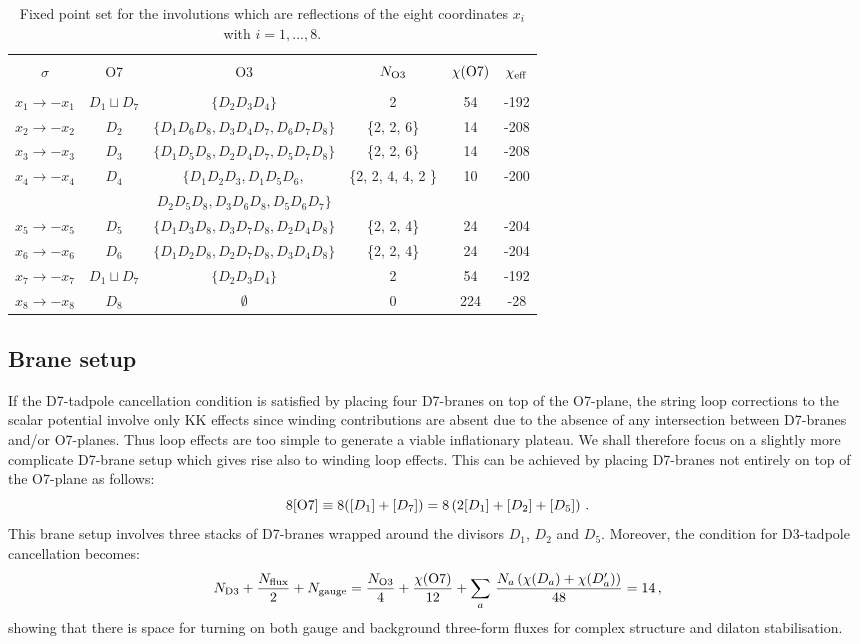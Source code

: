 \documentclass[11pt,a4paper]{article}
\newcommand{\be}{\begin{equation}}
\newcommand{\ee}{\end{equation}}
\def\nn{\nonumber}
\begin{document}
\begin{table}[H]
 \hskip-0cm
\begin{tabular}{|c|c|c|c|c|c|}
\hline
&  &  &  &  &  \\
$\sigma$ & O7  & O3  & $N_{\rm O3}$  & $\chi({\rm O7})$  & $\chi_{\rm eff}$       \\
&  &  &  &  &  \\
\hline
\hline
$x_1 \to -x_1$ &  $D_1\sqcup D_7$ & $\{D_2 D_3 D_4 \}$ & 2 & 54 & -192  \\
$x_2 \to -x_2$ &  $D_2$ & $\{{D_1 D_6 D_8}, {D_3 D_4 D_7}, {D_6 D_7 D_8}\}$ & \{2, 2, 6\} & 14 & -208 \\
$x_3 \to -x_3$ &  $D_3$ & $\{{D_1 D_5 D_8}, {D_2 D_4 D_7}, {D_5 D_7 D_8}\}$ & \{2, 2, 6\} & 14 & -208 \\
$x_4 \to -x_4$ &  $D_4$ & $\{{D_1 D_2 D_3}, {D_1 D_5 D_6}, $ & \{2, 2, 4, 4, 2 \} & 10 & -200  \\
 & & ${D_2 D_5 D_8}, {D_3 D_6 D_8}, {D_5 D_6 D_7} \}$ & & & \\
$x_5 \to -x_5$ &  $D_5$ & $\{{D_1 D_3 D_8}, {D_3  D_7 D_8}, {D_2 D_4 D_8} \}$ & \{2, 2, 4\} & 24 & -204  \\
$x_6 \to -x_6$ &  $D_6$ & $\{{D_1 D_2 D_8}, {D_2  D_7 D_8}, {D_3 D_4 D_8} \}$ & \{2, 2, 4\} & 24 & -204  \\
$x_7 \to -x_7$ &  $D_1\sqcup D_7$ & $\{D_2 D_3 D_4 \}$ & 2 & 54 & -192  \\
$x_8 \to -x_8$ &  $D_8$ & $\emptyset$ & 0 & 224 & -28  \\
\hline
\end{tabular}
\caption{Fixed point set for the involutions which are reflections of the eight coordinates $x_i$ with $i=1,...,8$.} 
\label{FixedPointsB} 
\end{table}

\subsection{Brane setup}

If the D7-tadpole cancellation condition is satisfied by placing four D7-branes on top of the O7-plane, the string loop corrections to the scalar potential involve only KK effects since winding contributions are absent due to the absence of any intersection between D7-branes and/or O7-planes. Thus loop effects are too simple to generate a viable inflationary plateau. We shall therefore focus on a slightly more complicate D7-brane setup which gives rise also to winding loop effects. This can be achieved by placing D7-branes not entirely on top of the O7-plane as follows:  
\be
8[{\rm O7}] \equiv 8([D_1]+[D_7]) =8 \left(2[D_1] + [D_2]+[D_5] \right)\,.
\ee
This brane setup involves three stacks of D7-branes wrapped around the divisors $D_1$, $D_2$ and $D_5$. Moreover, the condition for D3-tadpole cancellation becomes:
\be
N_{\rm D3} + \frac{N_{\rm flux}}{2} + N_{\rm gauge} = \frac{N_{\rm O3}}{4} + \frac{\chi({\rm O7})}{12} + \sum_a\, \frac{N_a \left(\chi(D_a) + \chi(D_a^\prime) \right) }{48}  = 14 \,, \nn
\ee
showing that there is space for turning on both gauge and background three-form fluxes for complex structure and dilaton stabilisation.
\end{document}
